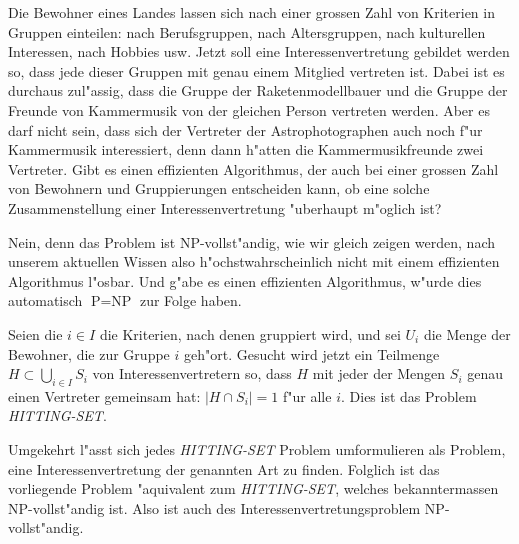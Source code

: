 Die Bewohner eines Landes lassen sich nach einer grossen Zahl
von Kriterien in Gruppen einteilen: nach Berufsgruppen, nach
Altersgruppen, nach kulturellen Interessen, nach Hobbies usw.
Jetzt soll eine Interessenvertretung gebildet werden so, dass
jede dieser Gruppen mit genau einem Mitglied vertreten ist.
Dabei ist es durchaus zul"assig, dass die Gruppe der Raketenmodellbauer
und die Gruppe der Freunde von Kammermusik von der gleichen Person
vertreten werden. Aber es darf nicht sein, dass sich der Vertreter
der Astrophotographen auch noch f"ur Kammermusik interessiert, denn
dann h"atten die Kammermusikfreunde zwei Vertreter.
Gibt es einen effizienten Algorithmus, der auch bei einer grossen
Zahl von Bewohnern und Gruppierungen entscheiden kann, ob eine
solche Zusammenstellung einer Interessenvertretung "uberhaupt
m"oglich ist?

\begin{loesung}
Nein, denn das Problem ist NP-vollst"andig, wie wir gleich
zeigen werden, nach unserem aktuellen
Wissen also h"ochstwahrscheinlich nicht mit einem effizienten
Algorithmus l"osbar. Und g"abe es einen effizienten Algorithmus,
w"urde dies automatisch $\text{P}=\text{NP}$ zur Folge haben.

Seien die $i\in I$ die Kriterien, nach denen gruppiert wird,
und sei $U_i$ die Menge der Bewohner, die zur Gruppe $i$ geh"ort.
Gesucht wird jetzt ein Teilmenge $H\subset\bigcup_{i\in I}S_i$
von Interessenvertretern so, dass $H$ mit jeder der Mengen
$S_i$ genau einen Vertreter gemeinsam hat: $|H\cap S_i|=1$
f"ur alle $i$. Dies ist das Problem {\textsl{HITTING-SET}}. 

Umgekehrt l"asst sich jedes {\textsl{HITTING-SET}} Problem umformulieren
als Problem, eine Interessenvertretung der genannten Art zu finden.
Folglich ist das vorliegende Problem "aquivalent zum {\textsl{HITTING-SET}},
welches bekanntermassen NP-vollst"andig ist. Also ist auch des
Interessenvertretungsproblem NP-vollst"andig.
\end{loesung}

